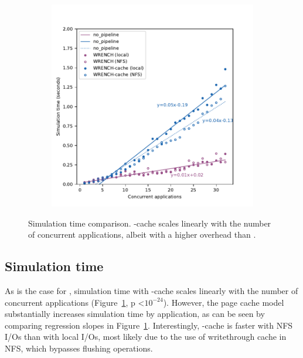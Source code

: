 \begin{figure}
    \begin{subfigure}{\columnwidth}
        \centering
        \includegraphics[width=\linewidth]{result/multi/figures/simulation_time.pdf}
    \end{subfigure}
    \caption{Simulation time comparison. \wrench-cache scales
    linearly with the number of concurrent applications, albeit
    with a higher overhead than \wrench.}
    \label{fig:multi_time}
\end{figure}

\subsection{Simulation time}

As is the case for \wrench, simulation time with \wrench-cache scales
linearly with the number of concurrent applications
(Figure~\ref{fig:multi_time}, p \textless $10^{-24}$). However, the page
cache model substantially increases simulation time by
application, as can be seen by comparing regression slopes in
Figure~\ref{fig:multi_time}. Interestingly, \wrench-cache is faster with 
NFS I/Os than with local I/Os, most likely due to the use of writethrough
cache in NFS, which bypasses flushing operations.